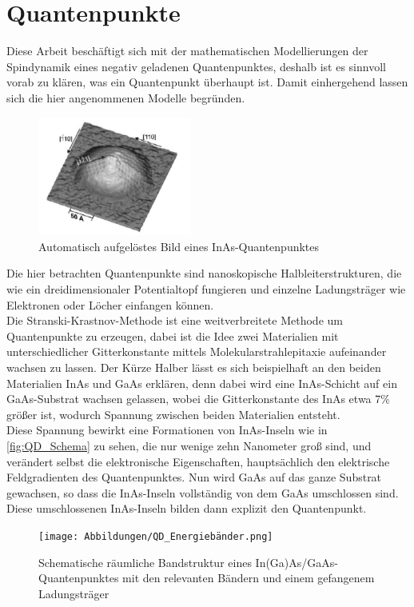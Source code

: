 \chapter{Quantenpunkte}

\noindent Diese Arbeit beschäftigt sich mit der mathematischen Modellierungen der Spindynamik eines negativ geladenen
Quantenpunktes, deshalb ist es sinnvoll vorab zu klären, was ein Quantenpunkt überhaupt ist. Damit einhergehend lassen sich die hier angenommenen Modelle begründen.\\
\begin{figure}[h!]
    \centering
    \includegraphics[width = 0.45\textwidth]{Abbildungen/einQD.png}
    \caption{Automatisch aufgelöstes Bild eines InAs-Quantenpunktes}
    \label{fig:QD_Schema}
\end{figure}

\noindent Die hier betrachten Quantenpunkte sind nanoskopische Halbleiterstrukturen, die wie ein dreidimensionaler Potentialtopf fungieren
und einzelne Ladungsträger wie Elektronen oder Löcher einfangen können.\\
Die Stranski-Krastnov-Methode ist eine weitverbreitete Methode um Quantenpunkte zu erzeugen, dabei ist die Idee zwei Materialien mit 
unterschiedlicher Gitterkonstante mittels Molekularstrahlepitaxie aufeinander wachsen zu lassen. Der Kürze Halber lässt es sich 
beispielhaft an den beiden Materialien InAs und GaAs erklären, denn dabei wird eine InAs-Schicht auf ein GaAs-Substrat wachsen gelassen, 
wobei die Gitterkonstante des InAs etwa 7\% größer ist, wodurch Spannung zwischen beiden Materialien entsteht. \\
\noindent Diese Spannung bewirkt eine Formationen von InAs-Inseln wie in \autoref{fig:QD_Schema} zu sehen, die nur wenige zehn 
Nanometer groß sind, und verändert selbst die elektronische Eigenschaften, hauptsächlich den elektrische Feldgradienten des 
Quantenpunktes. Nun wird GaAs auf das ganze Substrat gewachsen, so dass die InAs-Inseln vollständig von 
dem GaAs umschlossen sind. Diese umschlossenen InAs-Inseln bilden dann explizit den Quantenpunkt.\\
\begin{figure}
   \centering
    \texttt{[image: Abbildungen/QD\_Energiebänder.png]}
    \caption{Schematische räumliche Bandstruktur eines In(Ga)As/GaAs-Quantenpunktes mit den relevanten Bändern und einem 
    gefangenem Ladungsträger}
    \label{fig:QD_Bandstruktur}
\end{figure}

